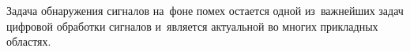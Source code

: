 
Задача обнаружения сигналов на~фоне помех остается одной из~важнейших задач цифровой обработки сигналов и~является актуальной во многих прикладных областях. 

